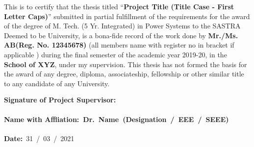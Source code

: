 \documentclass[a4paper, 12pt, oneside]{sastra}
\begin{document}
	
	
	
	
	
	
	\newpage
	
	\setcounter{page}{2}
	
	\certificate
	
	
	\begin{doublespace}
		\linespread{2}
		
		This is to certify that the thesis titled ``\textbf{Project Title (Title Case - First Letter Caps)}'' submitted in partial fulfillment of the requirements for the award of the degree of M. Tech. (5 Yr. Integrated) in Power Systems to the SASTRA Deemed to be University, is a bona-fide record of the work done by \textbf{Mr./Ms. AB(Reg. No. 12345678)} (all members name with register no in bracket if applicable ) during the final semester of the academic year 2019-20, in the \textbf{School of XYZ}, under my supervision. This thesis has not formed the basis for the award of any degree, diploma, associateship, fellowship or other similar title to any candidate of any University.
		
	\end{doublespace}
	\vspace*{0.4in}
	
	\noindent\textbf{Signature of Project Supervisor:}~	\\ %
	\\
	\textbf{Name with Affliation\hspace*{19mm}:~\textbf{Dr.~Name}~(Designation~/~EEE~/~SEEE)}	\\
	\\
	\textbf{Date\hspace*{48.25mm}:}~31~/~03~/~2021\\%
	
\end{document}
